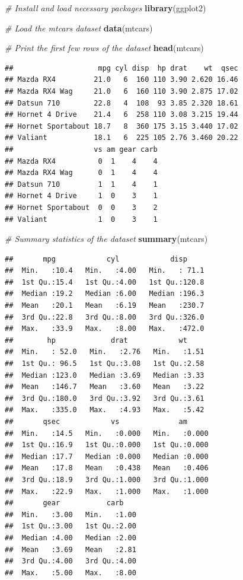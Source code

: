 \documentclass[
]{book}
\newenvironment{Shaded}{\begin{snugshade}}{\end{snugshade}}
\newcommand{\CommentTok}[1]{\textcolor[rgb]{0.56,0.35,0.01}{\textit{#1}}}
\newcommand{\FunctionTok}[1]{\textcolor[rgb]{0.13,0.29,0.53}{\textbf{#1}}}
\newcommand{\NormalTok}[1]{#1}
\begin{document}
\begin{Shaded}
\begin{Highlighting}[]
\CommentTok{\# Install and load necessary packages}
\FunctionTok{library}\NormalTok{(ggplot2)}

\CommentTok{\# Load the mtcars dataset}
\FunctionTok{data}\NormalTok{(mtcars)}

\CommentTok{\# Print the first few rows of the dataset}
\FunctionTok{head}\NormalTok{(mtcars)}
\end{Highlighting}
\end{Shaded}

\begin{verbatim}
##                    mpg cyl disp  hp drat    wt  qsec
## Mazda RX4         21.0   6  160 110 3.90 2.620 16.46
## Mazda RX4 Wag     21.0   6  160 110 3.90 2.875 17.02
## Datsun 710        22.8   4  108  93 3.85 2.320 18.61
## Hornet 4 Drive    21.4   6  258 110 3.08 3.215 19.44
## Hornet Sportabout 18.7   8  360 175 3.15 3.440 17.02
## Valiant           18.1   6  225 105 2.76 3.460 20.22
##                   vs am gear carb
## Mazda RX4          0  1    4    4
## Mazda RX4 Wag      0  1    4    4
## Datsun 710         1  1    4    1
## Hornet 4 Drive     1  0    3    1
## Hornet Sportabout  0  0    3    2
## Valiant            1  0    3    1
\end{verbatim}

\begin{Shaded}
\begin{Highlighting}[]
\CommentTok{\# Summary statistics of the dataset}
\FunctionTok{summary}\NormalTok{(mtcars)}
\end{Highlighting}
\end{Shaded}

\begin{verbatim}
##       mpg            cyl            disp      
##  Min.   :10.4   Min.   :4.00   Min.   : 71.1  
##  1st Qu.:15.4   1st Qu.:4.00   1st Qu.:120.8  
##  Median :19.2   Median :6.00   Median :196.3  
##  Mean   :20.1   Mean   :6.19   Mean   :230.7  
##  3rd Qu.:22.8   3rd Qu.:8.00   3rd Qu.:326.0  
##  Max.   :33.9   Max.   :8.00   Max.   :472.0  
##        hp             drat            wt      
##  Min.   : 52.0   Min.   :2.76   Min.   :1.51  
##  1st Qu.: 96.5   1st Qu.:3.08   1st Qu.:2.58  
##  Median :123.0   Median :3.69   Median :3.33  
##  Mean   :146.7   Mean   :3.60   Mean   :3.22  
##  3rd Qu.:180.0   3rd Qu.:3.92   3rd Qu.:3.61  
##  Max.   :335.0   Max.   :4.93   Max.   :5.42  
##       qsec            vs              am       
##  Min.   :14.5   Min.   :0.000   Min.   :0.000  
##  1st Qu.:16.9   1st Qu.:0.000   1st Qu.:0.000  
##  Median :17.7   Median :0.000   Median :0.000  
##  Mean   :17.8   Mean   :0.438   Mean   :0.406  
##  3rd Qu.:18.9   3rd Qu.:1.000   3rd Qu.:1.000  
##  Max.   :22.9   Max.   :1.000   Max.   :1.000  
##       gear           carb     
##  Min.   :3.00   Min.   :1.00  
##  1st Qu.:3.00   1st Qu.:2.00  
##  Median :4.00   Median :2.00  
##  Mean   :3.69   Mean   :2.81  
##  3rd Qu.:4.00   3rd Qu.:4.00  
##  Max.   :5.00   Max.   :8.00
\end{verbatim}
\end{document}
